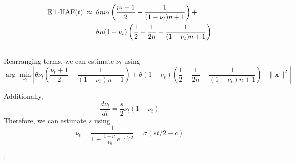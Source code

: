 \begin{align}
  \mathbb{E}[1\text{-HAF}(t)]\approx\;\; & \theta n \nu_t \left(\frac{\nu_t+1}{2} - \frac{1}{(1-\nu_t)n+1}\right) +\\
   & \theta n(1-\nu_t)\left(\frac{1}{2}+\frac{1}{2n}-\frac{1}{(1-\nu_t)n+1}\right) \\.
  \label{eq:hafscorepooled}
\end{align}
Rearranging terms, we can estimate $\nu_t$ using
\begin{equation}
\arg\min_{\nu_t} \left  \vert \theta \nu_t \left(\frac{\nu_t+1}{2} - \frac{1}{(1-\nu_t)n+1}\right) + \theta (1-\nu_t)\left(\frac{1}{2}+\frac{1}{2n}-\frac{1}{(1-\nu_t)n+1}\right) -\parallel \mathbf{x}\parallel^2 \right \vert
  \label{eq:pooledfrequency}
\end{equation}

Additionally,
\begin{equation}
  \frac{d\nu_t}{dt} = \frac{s}{2}\nu_t(1-\nu_t)   
\end{equation}
Therefore, we can estimate $s$ using
\begin{equation}
  \nu_t =\frac{1}{1+\frac{1-\nu_0}{\nu_0}e^{-st/2}} = \sigma(st/2-c) 
  \label{eq:labeledpooled_s}
\end{equation}

.




